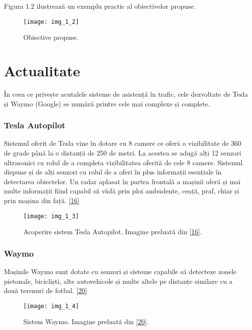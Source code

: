 Figura 1.2 ilustrează un exemplu practic al obiectivelor propuse.
\begin{figure}[!h]
	\centering
	\texttt{[image: img\_1\_2]}
	\caption{Obiective propuse.}
\end{figure} 

\section{Actualitate}

În ceea ce privește acutalele sisteme de asistență în trafic, cele dezvoltate de Tesla și Waymo (Google) se numără printre cele mai complexe și complete.

\subsubsection{Tesla Autopilot}

Sistemul oferit de Tesla vine în dotare cu 8 camere ce oferă o vizibilitate de 360 de grade până la o distanță de 250 de metri. La acestea se adugă alți 12 senzori ultrasonici cu rolul de a completa vizibilitatea oferită de cele 8 camere. Sistemul dispune și de alți senzori cu rolul de a oferi în plus informații esențiale în detectarea obiectelor. Un radar aplasat în partea frontală a mașinii oferă și mai multe informații fiind capabil să vădă prin ploi ambudente, ceață, praf, chiar și prin mașina din față. \hyperlink{TeslaAutopilotSystem}{[16]}

\begin{figure}[!h]
	\centering
	\texttt{[image: img\_1\_3]}
	\caption[Acoperire sistem Tesla Autopilot]{Acoperire sistem Tesla Autopilot. Imagine preluată din \hyperlink{TeslaAutopilotSystem}{[16]}.}
\end{figure} 

\subsubsection{Waymo}

Mașinile Waymo sunt dotate cu senzori și sisteme capabile să detecteze zonele pietonale, bicicliști, alte autovehicole și multe altele pe distanțe similare cu a două terenuri de fotbal. \hyperlink{WaymoSystem}{[20]}

\begin{figure}[!h]
	\centering
	\texttt{[image: img\_1\_4]}
	\caption[Sistem Waymo]{Sistem Waymo. Imagine preluată din \hyperlink{WaymoSystem}{[20]}.}
\end{figure} 

